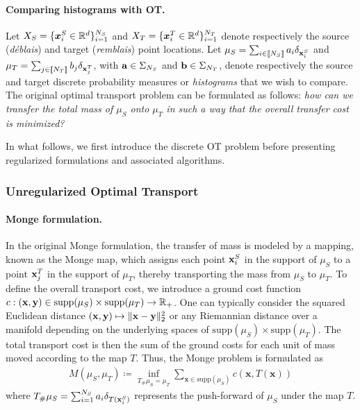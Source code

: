 \paragraph{Comparing histograms with OT.}
Let $X_S = \{ \bm{x}_i^S \in \mathbb{R}^d \}_{i=1}^{N_S}$ and $X_T = \{ \bm{x}_i^T \in \mathbb{R}^d \}_{i=1}^{N_T}$ denote respectively the source (\emph{déblais}) and target (\emph{remblais}) point locations. Let  \(\mu_S = \sum_{i \in {[\![N_S]\!]}} a_i \delta_{{\mathbf{x}}^S_i}\) and \(\mu_T = \sum_{j \in {[\![N_T]\!]}} b_j \delta_{{\mathbf{x}}^T_j}\), with ${\mathbf{a}} \in \Sigma_{N_S}$ and ${\mathbf{b}} \in \Sigma_{N_T}$, denote respectively the source and target discrete probability measures or \emph{histograms} that we wish to compare. The original optimal transport problem can be formulated as follows: \emph{how can we transfer the total mass of \(\mu_S\) onto \(\mu_T\) in such a way that the overall transfer cost is minimized?}

In what follows, we first introduce the discrete OT problem before presenting regularized formulations and associated algorithms.

\subsubsection{Unregularized Optimal Transport}

\paragraph{Monge formulation.}
In the original Monge formulation, the transfer of mass is modeled by a mapping, known as the Monge map, which assigns each point \({\mathbf{x}}^S_i\) in the support of \(\mu_S\) to a point \({\mathbf{x}}^T_j\) in the support of \(\mu_T\), thereby transporting the mass from \(\mu_S\) to \(\mu_T\). To define the overall transport cost, we introduce a ground cost function \(c: ({\mathbf{x}}, {\mathbf{y}}) \in \text{supp}(\mu_S) \times \text{supp}(\mu_T) \to \mathbb{R}_+\). One can typically consider the squared Euclidean distance $({\mathbf{x}}, {\mathbf{y}}) \mapsto \| {\mathbf{x}} - {\mathbf{y}} \|_2^2$ or any Riemannian distance over a manifold \citep{villani2009optimal} depending on the underlying spaces of $\text{supp}(\mu_S) \times \text{supp}(\mu_T)$. The total transport cost is then the sum of the ground costs for each unit of mass moved according to the map \(T\). Thus, the Monge problem is formulated as
\begin{align}
    \label{eq:monge_pb}
    \tag{Monge}
    M(\mu_S, \mu_T) \coloneqq \inf_{T_{\#}\mu_S = \mu_T} \sum_{\bm{x} \in \text{supp}(\mu_S)} c(\bm{x}, T(\bm{x}))
\end{align}
where \(T_{\#}\mu_S = \sum_{i=1}^{N_S} a_i \delta_{T({\mathbf{x}}_i^S)}\) represents the push-forward of \(\mu_S\) under the map \(T\).

